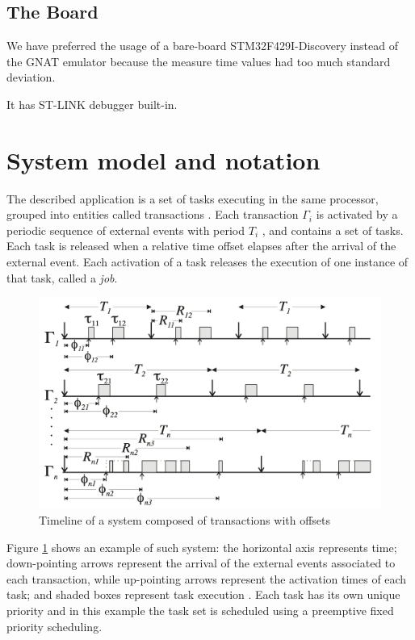 \documentclass{article}
\begin{document}
\subsection{The Board}

We have preferred the usage of a bare-board STM32F429I-Discovery instead of the GNAT emulator because the measure time values had too much standard deviation.

It has ST-LINK debugger built-in.

\section{System model and notation}

The described application is a set of tasks executing in the same processor, grouped into entities called transactions \cite{tindell-offsets}. Each transaction $\Gamma_i$ is activated by a periodic sequence of external events with period $T_i$ , and contains a set of tasks. Each task is released when a relative time offset elapses after the arrival of the external event. Each activation of a task releases the execution of one instance of that task, called a \textit{job}.

\begin{figure}[!htbp]
\centering
\includegraphics[width=5in]{images/transactions}
\caption{Timeline of a system composed of transactions with offsets \cite{pessimistic-rma}}
\label{transactions}
\end{figure}

Figure \ref{transactions} shows an example of such system: the horizontal axis represents time; down-pointing arrows represent the arrival of the external events associated to each transaction, while up-pointing arrows represent the activation times of each task; and shaded boxes represent task execution \cite{pessimistic-rma}. Each task has its own unique priority and in this example the task set is scheduled using a preemptive fixed priority scheduling.
\end{document}
